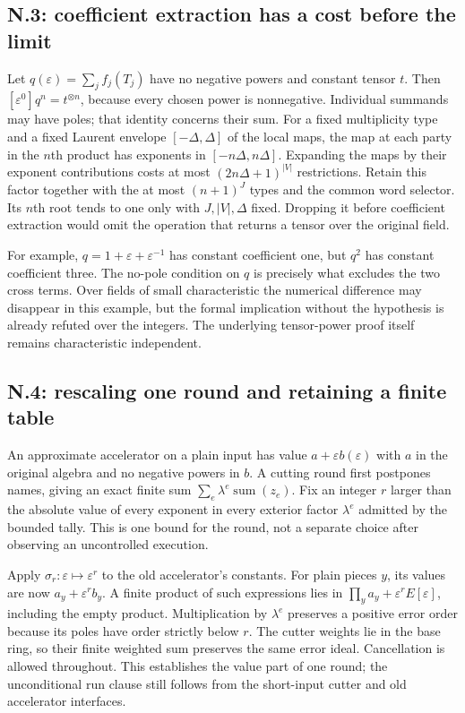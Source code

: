 \documentclass[11pt,letterpaper]{article}
\theoremstyle{definition}\newtheorem{definition}[theorem]{Definition}\newtheorem{example}[theorem]{Example}
\theoremstyle{remark}\newtheorem{remark}[theorem]{Remark}
\begin{document}
\subsection{N.3: coefficient extraction has a cost before the limit}
Let $q(\varepsilon)=\sum_jf_j(T_j)$ have no negative powers and constant tensor $t$. Then $[\varepsilon^0]q^n=t^{\otimes n}$, because every chosen power is nonnegative. Individual summands may have poles; that identity concerns their sum. For a fixed multiplicity type and a fixed Laurent envelope $[-\Delta,\Delta]$ of the local maps, the map at each party in the $n$th product has exponents in $[-n\Delta,n\Delta]$. Expanding the maps by their exponent contributions costs at most $(2n\Delta+1)^{|V|}$ restrictions. Retain this factor together with the at most $(n+1)^J$ types and the common word selector. Its $n$th root tends to one only with $J,|V|,\Delta$ fixed. Dropping it before coefficient extraction would omit the operation that returns a tensor over the original field.

For example, $q=1+\varepsilon+\varepsilon^{-1}$ has constant coefficient one, but $q^2$ has constant coefficient three. The no-pole condition on $q$ is precisely what excludes the two cross terms. Over fields of small characteristic the numerical difference may disappear in this example, but the formal implication without the hypothesis is already refuted over the integers. The underlying tensor-power proof itself remains characteristic independent.

\subsection{N.4: rescaling one round and retaining a finite table}
An approximate accelerator on a plain input has value $a+\varepsilon b(\varepsilon)$ with $a$ in the original algebra and no negative powers in $b$. A cutting round first postpones names, giving an exact finite sum $\sum_e\lambda^e\operatorname{sum}(z_e)$. Fix an integer $r$ larger than the absolute value of every exponent in every exterior factor $\lambda^e$ admitted by the bounded tally. This is one bound for the round, not a separate choice after observing an uncontrolled execution.

Apply $\sigma_r:\varepsilon\mapsto\varepsilon^r$ to the old accelerator's constants. For plain pieces $y$, its values are now $a_y+\varepsilon^rb_y$. A finite product of such expressions lies in $\prod_y a_y+\varepsilon^rE[\varepsilon]$, including the empty product. Multiplication by $\lambda^e$ preserves a positive error order because its poles have order strictly below $r$. The cutter weights lie in the base ring, so their finite weighted sum preserves the same error ideal. Cancellation is allowed throughout. This establishes the value part of one round; the unconditional run clause still follows from the short-input cutter and old accelerator interfaces.
\end{document}
